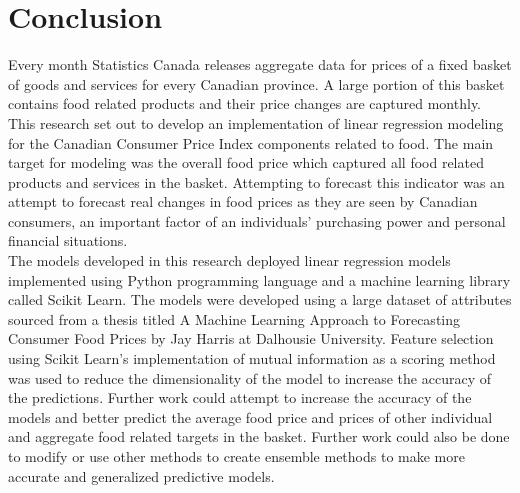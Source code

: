\documentclass[12pt]{dalthesis}
\begin{document}
\section{Conclusion}

Every month Statistics Canada releases aggregate data for prices of a fixed basket of goods and services for every Canadian province. A large portion of this basket contains food related products and their price changes are captured monthly. This research set out to develop an implementation of linear regression modeling for the Canadian Consumer Price Index components related to food. The main target for modeling was the overall food price which captured all food related products and services in the basket. Attempting to forecast this indicator was an attempt to forecast real changes in food prices as they are seen by Canadian consumers, an important factor of an individuals’ purchasing power and personal financial situations. \\

The models developed in this research deployed linear regression models implemented using Python programming language and a machine learning library called Scikit Learn. The models were developed using a large dataset of attributes sourced from a thesis titled A Machine Learning Approach to Forecasting Consumer Food Prices by Jay Harris at Dalhousie University. Feature selection using Scikit Learn’s implementation of mutual information as a scoring method was used to reduce the dimensionality of the model to increase the accuracy of the predictions. Further work could attempt to increase the accuracy of the models and better predict the average food price and prices of other individual and aggregate food related targets in the basket. Further work could also be done to modify or use other methods to create ensemble methods to make more accurate and generalized predictive models. \\





\end{document}
